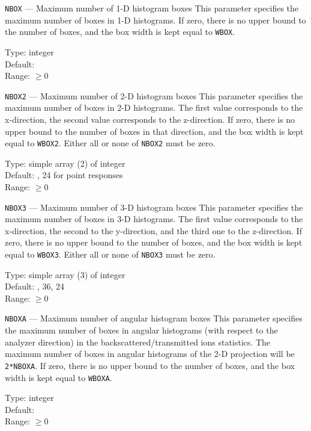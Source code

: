\begin{keydescription}{\texttt{NBOX} --- Maximum number of 1-D histogram boxes}
%
  This parameter specifies the maximum number of boxes in 1-D histograms. If
  zero, there is no upper bound to the number of boxes, and the box width is
  kept equal to \texttt{WBOX}.
  \begin{keytab}
    Type:    \> integer \\
    Default:  \\
    Range:   \> $\ge 0$
  \end{keytab}
\end{keydescription}

\begin{keydescription}{\texttt{NBOX2} --- Maximum number of 2-D histogram boxes} 
%
  This parameter specifies the maximum number of boxes in 2-D histograms. The first value 
  corresponds to the x-direction, the second value corresponds to the
  z-direction. If zero, there is no upper bound to the number of boxes in that
  direction, and the box width is kept equal to \texttt{WBOX2}. Either all or
  none of \texttt{NBOX2} must be zero.
  \begin{keytab}
    Type:    \> simple array (2) of integer \\
    Default: , 24 for point responses \\
    Range:   \> $\ge 0$
  \end{keytab}
\end{keydescription}

\begin{keydescription}{\texttt{NBOX3} --- Maximum number of 3-D histogram boxes} 
%
  This parameter specifies the maximum number of boxes in 3-D histograms. The first value 
  corresponds to the x-direction, the second to the y-direction, and the third one to the 
  z-direction. If zero, there is no upper bound to the number of boxes, and the
  box width is kept equal to \texttt{WBOX3}. Either all or none of \texttt{NBOX3} must be zero. 
  \begin{keytab}
    Type:    \> simple array (3) of integer \\
    Default: , 36, 24 \\
    Range:   \> $\ge 0$
  \end{keytab}
\end{keydescription}

\begin{keydescription}{\texttt{NBOXA} --- Maximum number of angular histogram boxes}
%
  This parameter specifies the maximum number of boxes in angular histograms
  (with respect to the analyzer direction) in the backscattered/transmitted ions
  statistics.  The maximum number of boxes in angular histograms of the 2-D
  projection will be \texttt{2*NBOXA}. If zero, there is no upper bound to the
  number of boxes, and the box width is kept equal to \texttt{WBOXA}.
  \begin{keytab}
    Type:    \> integer \\
    Default:  \\
    Range:   \> $\ge 0$
  \end{keytab}
\end{keydescription}

